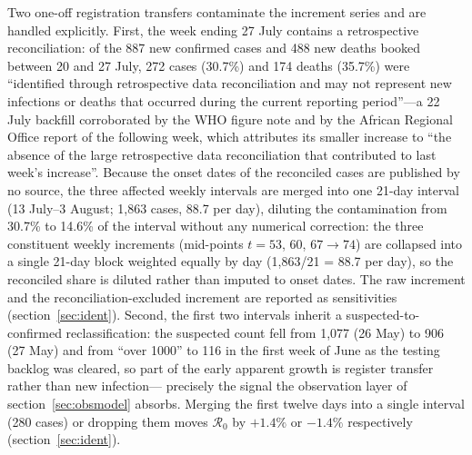 \documentclass[preprint,12pt,numbers]{elsarticle}
\newcommand{\Reff}{\mathcal{R}}
\begin{document}
Two one-off registration transfers contaminate the increment series and
are handled explicitly. First, the week ending 27 July contains a
retrospective reconciliation: of the 887 new confirmed cases and 488 new
deaths booked between 20 and 27 July, 272 cases (30.7\%) and 174 deaths
(35.7\%) were ``identified through retrospective data reconciliation and
may not represent new infections or deaths that occurred during the
current reporting period''---a 22 July backfill
corroborated by the WHO figure note  and by the African
Regional Office report of the following week, which attributes its
smaller increase to ``the absence of the large retrospective data
reconciliation that contributed to last week's increase''. Because the onset dates of the reconciled cases are
published by no source, the three affected weekly intervals are merged
into one 21-day interval (13 July--3 August; 1{,}863 cases, 88.7 per
day), diluting the contamination from 30.7\% to 14.6\% of the interval
without any numerical correction: the three constituent weekly increments
(mid-points $t=53$, $60$, $67\to74$) are collapsed into a single
21-day block weighted equally by day (1{,}863/21 = 88.7 per day), so the
reconciled share is diluted rather than imputed to onset dates. The raw
increment and the
reconciliation-excluded increment are reported as sensitivities
(section~\ref{sec:ident}). Second, the first two intervals inherit a
suspected-to-confirmed reclassification: the suspected count fell from
1{,}077 (26 May) to 906 (27 May) and from ``over 1000'' to 116 in the
first week of June as the testing backlog was cleared, so part of the early
apparent growth is register transfer rather than new infection---
precisely the signal the observation layer of
section~\ref{sec:obsmodel} absorbs. Merging the first twelve days into a
single interval (280 cases) or dropping them moves $\Reff_0$ by $+1.4\%$
or $-1.4\%$ respectively (section~\ref{sec:ident}).
\end{document}

